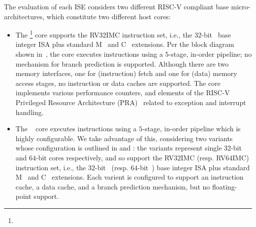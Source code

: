 
The evaluation of each ISE considers two different RISC-V compliant base
micro-architectures, which constitute two different host cores:

\begin{itemize}
\item The \footnote{%
      } core 
      supports the 
      RV32IMC 
      instruction set, i.e.,
      the 
             $32$-bit~\cite[Section 2]{RV:ISA:I:19} 
      base integer ISA plus 
      standard 
      M~\cite[Section  7]{RV:ISA:I:19}
      and
      C~\cite[Section 16]{RV:ISA:I:19}
      extensions.
      Per the block diagram shown in~,
      the core 
      executes instructions using a $5$-stage, in-order pipeline;
      no mechanism for
      branch prediction
      is supported.
      Although there are two memory interfaces, one for (instruction) fetch and one for (data) memory access stages,
      no
      instruction or data caches 
      are supported.
      The core implements various performance counters,
      and
      elements of the
      RISC-V Privileged Resource Architecture (PRA)~\cite[Chapter 3]{RV:ISA:II:17}
      related to exception and interrupt handling.

\item The ~\cite{rocket:16} 
        core
      executes instructions using a $5$-stage, in-order pipeline
      which is highly configurable.
      We take advantage of this, considering two variants whose configuration
      is outlined in
      and 
      :
      the variants represent single $32$-bit and $64$-bit cores respectively,
      and so
      support  the 
      RV32IMC 
      (resp. RV64IMC)
      instruction set, i.e.,
      the 
             $32$-bit~\cite[Section 2]{RV:ISA:I:19} 
      (resp. $64$-bit~\cite[Section 5]{RV:ISA:I:19})
      base integer ISA plus 
      standard 
      M~\cite[Section  7]{RV:ISA:I:19}
      and
      C~\cite[Section 16]{RV:ISA:I:19}
      extensions.
      Each varient is configured to support
      an instruction cache, 
      a  data        cache,
      and
      a  branch prediction mechanism,
      but 
      no floating-point support.

\end{itemize}

